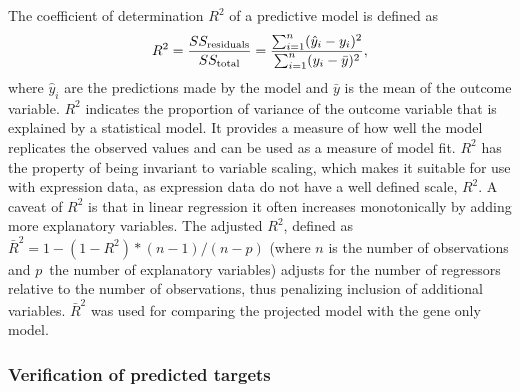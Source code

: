 The coefficient of determination $R^2$ of a predictive model is defined as
\begin{equation}
	R^2 = \frac{SS_{\textup{residuals}}}{SS_{\textup{total}}} = \frac{\sum_{i=1}^{n}(\hat{y}_i-y_i)^2}{\sum_{i=1}^{n}(y_i-\bar{y})^2},
\end{equation}
where $\hat{y}_i$ are the predictions made by the model and $\bar{y}$ is the mean of the outcome variable.
$R^2$ indicates the proportion of variance of the outcome variable that is explained
by a statistical model. It provides a measure of how well the model
replicates the observed values and can be used as a measure of model fit.
$R^2$ has the property of being invariant to variable scaling, which
makes it suitable for use with expression data, as expression data
do not have a well defined scale, $R^2$. A caveat of
$R^2$ is that in linear regression it often increases monotonically by adding more explanatory
variables. The adjusted $R^2$, defined as $\bar{R}^2 = 1-(1-R^2)*(n-1)/(n-p)$
(where $n$ is the number of observations and $p$ the number of explanatory
variables) adjusts for the number of regressors relative to the number of
observations, thus penalizing inclusion of additional variables. $\bar{R}^2$
was used for comparing the projected model with the gene only model.



\subsubsection{Verification of predicted targets}

